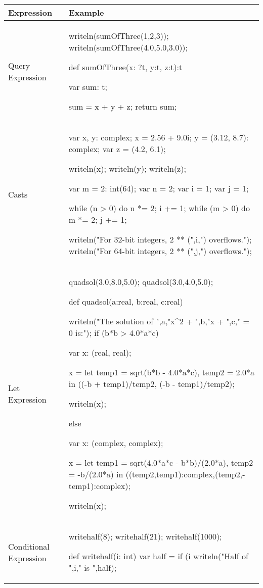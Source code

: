 \begin{center}
\begin{tabular}{|l|l|}
\hline
{\bf Expression} & {\bf Example} \\
\hline
Query Expression &
\begin{chapel} %
writeln(sumOfThree(1,2,3));
writeln(sumOfThree(4.0,5.0,3.0));

def sumOfThree(x: ?t, y:t, z:t):t {
   var sum: t;

   sum = x + y + z;
   return sum;
}
\end{chapel} \\
\hline
Casts &
\begin{chapel} %
var x, y: complex;
x = 2.56 + 9.0i;
y = (3.12, 8.7): complex;
var z = (4.2, 6.1);

writeln(x);
writeln(y);
writeln(z);

var m = 2: int(64);
var n = 2;
var i = 1;
var j = 1;

while (n > 0) do {
  n *= 2;
  i += 1;
}
while (m > 0) do {
  m *= 2;
  j += 1;
}

writeln("For 32-bit integers, 2 ** (",i,") overflows.");
writeln("For 64-bit integers, 2 ** (",j,") overflows.");
\end{chapel} \\
\hline
Let Expression &
\begin{chapel} %
quadsol(3.0,8.0,5.0);
quadsol(3.0,4.0,5.0);

def quadsol(a:real, b:real, c:real) {
  writeln("The solution of ",a,"x^2 + ",b,"x + ",c," = 0 is:");
  if (b*b > 4.0*a*c) {
    var x:  (real, real);

    x = let temp1 = sqrt(b*b - 4.0*a*c), temp2 = 2.0*a in
        ((-b + temp1)/temp2, (-b - temp1)/temp2);

    writeln(x);
  } else {
    var x: (complex, complex);

    x = let temp1 = sqrt(4.0*a*c - b*b)/(2.0*a), temp2 = -b/(2.0*a) in
        ((temp2,temp1):complex,(temp2,-temp1):complex);

    writeln(x);
  }
}
\end{chapel} \\
\hline
Conditional Expression &
\begin{chapel} %
writehalf(8);
writehalf(21);
writehalf(1000);

def writehalf(i: int) {
  var half = if (i %
  writeln("Half of ",i," is ",half);
}
\end{chapel} \\
\hline
\end{tabular}
\end{center}

